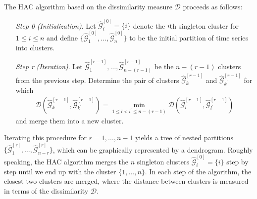 \documentclass[a4paper,12pt]{article}
\numberwithin{equation}{section}
\begin{document}
The HAC algorithm based on the dissimilarity measure $\mathcal{D}$ proceeds as follows:
\begin{itemize}[leftmargin=1.4cm]

\item[\textit{Step 0}] \textit{(Initialization)}. Let $\hat{\mathcal{G}}_i^{[0]} = \{i\}$ denote the $i$th singleton cluster for $1 \leq i \leq n$ and define $\{\hat{\mathcal{G}}_1^{[0]}, \ldots, \hat{\mathcal{G}}_n^{[0]}\}$ to be the
initial partition of time series into clusters.

\item[\textit{Step r}] \textit{(Iteration)}. Let $\hat{\mathcal{G}}^{[r-1]}_1, \ldots, \hat{\mathcal{G}}^{[r-1]}_{n - (r-1)}$ be the $n-(r-1)$ clusters from the previous step. Determine the pair of clusters $\hat{\mathcal{G}}^{[r-1]}_k$ and $\hat{\mathcal{G}}^{[r-1]}_{k^\prime}$ for which 
\begin{align*}
\mathcal{D}(\hat{\mathcal{G}}^{[r-1]}_{k}, \hat{\mathcal{G}}^{[r-1]}_{k^\prime}) = \min_{1 \leq l < l^\prime \leq n- (r-1)} \mathcal{D}(\hat{\mathcal{G}}^{[r-1]}_{l}, \hat{\mathcal{G}}^{[r-1]}_{l^\prime})
\end{align*}
and merge them into a new cluster.

\end{itemize}
Iterating this procedure for $r = 1, \ldots, n-1$ yields a tree of nested partitions $\{\hat{\mathcal{G}}^{[r]}_1, \ldots, \hat{\mathcal{G}}^{[r]}_{n-r} \}$, which can be graphically represented by a dendrogram. Roughly speaking, the HAC algorithm merges the $n$ singleton clusters $\hat{\mathcal{G}}^{[0]}_i = \{i\}$ step by step until we end up with the cluster $\{1, \ldots, n\}$. In each step of the algorithm, the closest two clusters are merged, where the distance between clusters is measured in terms of the dissimilarity $\mathcal{D}$. %

\vspace{10pt}
\end{document}
